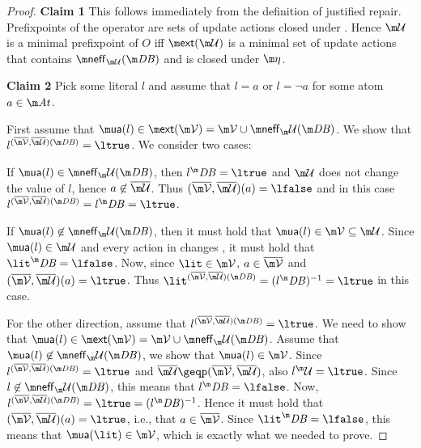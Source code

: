 {\begin{proof}
% 

\textbf{Claim 1} This follows immediately from the definition of justified repair. Prefixpoints of the \closure operator are sets of update actions closed under \aics. Hence $\UU$ is a minimal prefixpoint of $O$ iff $\ext(\UU)$ is a minimal set of update actions that contains $\neff_{\UU}(\db)$ and is closed under $\aics$. 





\textbf{Claim 2} Pick some literal $l$ and assume that $l=a$ or $l=\lnot a$ for some atom $a\in \atoms$.

First assume that $\actof(l)\in\ext(\VV)=\VV\cup\neff_\UU(\db)$. We show that $l^{(\overline \VV, \overline \UU)(\db)} = \ltrue$. 
 We consider two cases:
\begin{compactitem}
 \item If $\actof(l)\in \neff_\UU(\db)$, then $l^\db = \ltrue$ and $\UU$ does not change the value of $l$, hence $a\not\in\overline\UU$. Thus $(\overline \VV,\overline \UU)(a)=\lfalse$ and in this case $l^{(\overline \VV,\overline \UU)(\db)} = l^\db = \ltrue$. 
 \item If $\actof(l)\not\in \neff_\UU(\db)$, then it must hold that $\actof(l) \in \VV\subseteq \UU$. Since $\actof(l)\in \UU$ and every action in \UU changes \db, it must hold that $\lit^\db=\lfalse$. Now, since $\lit \in \VV$, $a\in \overline \VV$ and $(\overline \VV, \overline \UU) (a) = \ltrue$. Thus $\lit^{(\overline\VV,\overline\UU)(\db)} = (l^\db)^{-1} = \ltrue$ in this case. 
\end{compactitem}
For the other direction, assume that $l^{(\overline \VV, \overline \UU)(\db)} = \ltrue$. We need to show that $\actof(l)\in\ext(\VV)=\VV\cup\neff_\UU(\db)$. Assume that $\actof(l)\not\in \neff_\UU(\db)$, we show that $\actof(l)\in \VV$. 
Since $l^{(\overline \VV, \overline \UU)(\db)} = \ltrue$ and $\overline\UU\geqp (\overline\VV,\overline\UU)$, also $l^\UU=\ltrue$. Since $l\not\in \neff_\UU(\db)$, this means that $l^\db=\lfalse$.
Now,
$l^{(\overline \VV, \overline \UU)(\db)} = \ltrue = (l^\db)^{-1}$. Hence it must hold that $(\overline \VV,\overline \UU)(a) = \ltrue$, i.e., that $a\in \overline \VV$. Since $\lit^\db = \lfalse$, this means that $  \actof{(\lit)}\in \VV$, which is exactly what we needed to prove. 



\end{proof}}
